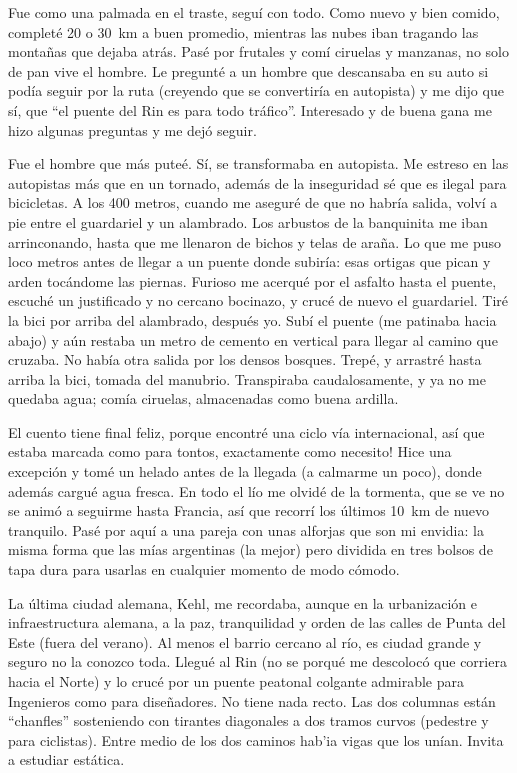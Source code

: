 Fue como una palmada en el traste, segu\'i con todo. Como nuevo y bien comido,
complet\'e 20 o 30~km a buen promedio, mientras las nubes iban tragando las
monta\~nas que dejaba atr\'as. Pas\'e por frutales y com\'i ciruelas y
manzanas, no solo de pan vive el hombre. Le pregunt\'e a un hombre que
descansaba en su auto si pod\'ia seguir por la ruta (creyendo que se
convertir\'ia en autopista) y me dijo que s\'i, que ``el puente del Rin es
para todo tr\'afico''. Interesado y de buena gana me hizo algunas preguntas y
me dej\'o seguir.

Fue el hombre que m\'as pute\'e. S\'i, se transformaba en autopista. Me
estreso en las autopistas m\'as que en un tornado, adem\'as de la inseguridad
s\'e que es ilegal para bicicletas. A los 400 metros, cuando me asegur\'e de
que no habr\'ia salida, volv\'i a pie entre el guardariel y un alambrado. Los
arbustos de la banquinita me iban arrinconando, hasta que me llenaron de
bichos y telas de ara\~na. Lo que me puso loco metros antes de llegar a un
puente donde subir\'ia: esas ortigas que pican y arden toc\'andome las
piernas. Furioso me acerqu\'e por el asfalto hasta el puente, escuch\'e un
justificado y no cercano bocinazo, y cruc\'e de nuevo el guardariel. Tir\'e la
bici por arriba del alambrado, despu\'es yo. Sub\'i el puente (me patinaba
hacia abajo) y a\'un restaba un metro de cemento en vertical para llegar al
camino que cruzaba. No hab\'ia otra salida por los densos bosques.
Trep\'e, y arrastr\'e hasta arriba la bici, tomada del manubrio. Transpiraba
caudalosamente, y ya no me quedaba agua; com\'ia ciruelas, almacenadas como
buena ardilla.

El cuento tiene final feliz, porque encontr\'e una ciclo v\'ia internacional,
as\'i que estaba marcada como para tontos, \textexclamdown exactamente como
necesito! Hice una excepci\'on y tom\'e un helado antes de la llegada (a
calmarme un poco), donde adem\'as cargu\'e agua fresca. En todo el l\'io me
olvid\'e de la tormenta, que se ve no se anim\'o a seguirme hasta Francia,
as\'i que recorr\'i los \'ultimos 10~km de nuevo tranquilo. Pas\'e por aqu\'i
a una pareja con unas alforjas que son mi envidia: la misma forma que las
m\'ias argentinas (la mejor) pero dividida en tres bolsos de tapa dura para
usarlas en cualquier momento de modo c\'omodo.

La \'ultima ciudad alemana, Kehl, me recordaba, aunque en la urbanizaci\'on e
infraestructura alemana, a la paz, tranquilidad y orden de las calles de Punta
del Este (fuera del verano). Al menos el barrio cercano al r\'io, es ciudad
grande y seguro no la conozco toda. Llegu\'e al Rin (no se porqu\'e me
descoloc\'o que corriera hacia el Norte) y lo cruc\'e por un puente peatonal
colgante admirable para Ingenieros como para dise\~nadores. No tiene nada recto.
Las dos columnas est\'an ``chanfles'' sosteniendo con tirantes diagonales a dos
tramos curvos (pedestre y para ciclistas). Entre medio de los dos caminos hab'ia
vigas que los un\'ian. Invita a estudiar est\'atica.

